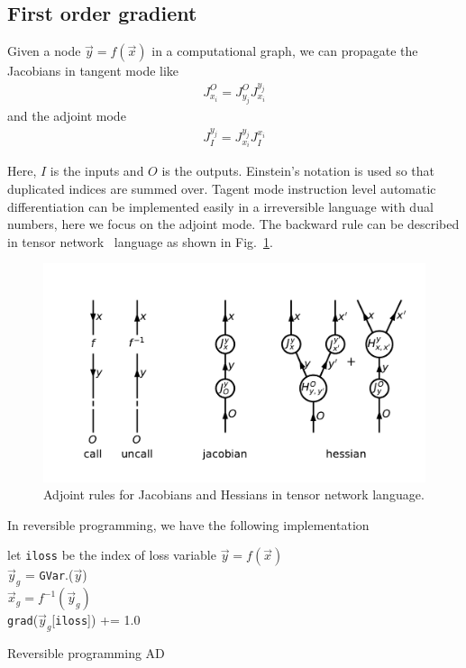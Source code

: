 \documentclass[aps,twocolumn,longbibliography,english,superscriptaddress,prr]{revtex4-1}
\newcommand{\<}{\langle}
\renewcommand{\>}{\rangle}
\newcommand{\out}{{O}}
\newcommand{\inp}{{I}}
\newcommand{\vx}{{\vec x}}
\newcommand{\vy}{{\vec y}}
\newcommand{\grad}{{\texttt{grad}}}
\newcommand{\Fig}[1]{Fig.~\ref{#1}}
\theoremstyle{definition}\newtheorem{definition}{\textit{Definition}}
\begin{document}
\subsection{First order gradient}\label{sec:jacobian}
Given a node $\vec y = f(\vec x)$ in a computational graph, we can propagate the Jacobians in tangent mode like
\begin{align}
    J^\out_{x_i} = J^\out_{y_j} J^{y_j}_{x_i}
\end{align}
and the adjoint mode
\begin{align}
    J^{y_j}_\inp = J^{y_j}_{x_i} J_\inp^{x_i}
\end{align}

Here, $\inp$ is the inputs and $\out$ is the outputs.
Einstein's notation is used so that duplicated indices are summed over.
Tagent mode instruction level automatic differentiation can be implemented easily in a irreversible language with dual numbers,
here we focus on the adjoint mode.
The backward rule can be described in tensor network~\cite{} language as shown in \Fig{fig:ad}.
\begin{figure}
    \centerline{\includegraphics[width=0.9\columnwidth,trim={0.5cm 1cm 0 1cm},clip]{images/ad.pdf}}
    \caption{Adjoint rules for Jacobians and Hessians in tensor network language.}\label{fig:ad}
\end{figure}

In reversible programming, we have the following implementation
\begin{algorithm}[H]
    \KeResult{\grad.($\vx_g$)}
    let \texttt{iloss} be the index of loss variable
    $\vy = f(\vx)$\\
    $\vy_g$ = \texttt{GVar}.($\vy$)\\
    $\vx_g = f^{-1}(\vy_g)$\\
    \grad($\vy_g$[\texttt{iloss}]) += 1.0
    \caption{Reversible programming AD}
\end{algorithm}
\end{document}
